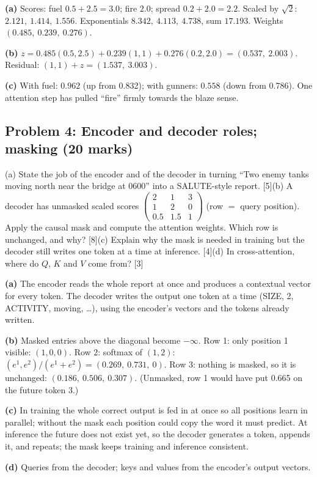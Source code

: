 \documentclass[11pt]{article}
\begin{document}
\begin{soln}\textbf{(a)} Scores: fuel $0.5+2.5=3.0$; fire $2.0$; spread $0.2+2.0=2.2$. Scaled by $\sqrt2$: $2.121,\ 1.414,\ 1.556$. Exponentials $8.342,\ 4.113,\ 4.738$, sum $17.193$. Weights $(\mathbf{0.485},\ \mathbf{0.239},\ \mathbf{0.276})$.

\textbf{(b)} $z=0.485(0.5,2.5)+0.239(1,1)+0.276(0.2,2.0)=(\mathbf{0.537},\ \mathbf{2.003})$. Residual: $(1,1)+z=(\mathbf{1.537},\ \mathbf{3.003})$.

\textbf{(c)} With fuel: $\mathbf{0.962}$ (up from 0.832); with gunners: $\mathbf{0.558}$ (down from 0.786). One attention step has pulled ``fire'' firmly towards the blaze sense.\end{soln}

\subsection{Problem 4: Encoder and decoder roles; masking \normalfont\small\color{GreyN}(20 marks)}

\begin{prob}(a) State the job of the encoder and of the decoder in turning ``Two enemy tanks moving north near the bridge at 0600'' into a SALUTE-style report. [5]\newline (b) A decoder has unmasked scaled scores $\begin{pmatrix}2&1&3\\1&2&0\\0.5&1.5&1\end{pmatrix}$ (row $=$ query position). Apply the causal mask and compute the attention weights. Which row is unchanged, and why? [8]\newline (c) Explain why the mask is needed in training but the decoder still writes one token at a time at inference. [4]\newline (d) In cross-attention, where do $Q$, $K$ and $V$ come from? [3]\end{prob}

\begin{soln}\textbf{(a)} The encoder reads the whole report at once and produces a contextual vector for every token. The decoder writes the output one token at a time (SIZE, 2, ACTIVITY, moving, \ldots{}), using the encoder's vectors and the tokens already written.

\textbf{(b)} Masked entries above the diagonal become $-\infty$. Row 1: only position 1 visible: $(1,0,0)$. Row 2: softmax of $(1,2)$: $(e^1,e^2)/(e^1+e^2)=(\mathbf{0.269},\ \mathbf{0.731},\ 0)$. Row 3: nothing is masked, so it is unchanged: $(\mathbf{0.186},\ \mathbf{0.506},\ \mathbf{0.307})$. (Unmasked, row 1 would have put 0.665 on the future token 3.)

\textbf{(c)} In training the whole correct output is fed in at once so all positions learn in parallel; without the mask each position could copy the word it must predict. At inference the future does not exist yet, so the decoder generates a token, appends it, and repeats; the mask keeps training and inference consistent.

\textbf{(d)} Queries from the decoder; keys and values from the encoder's output vectors.\end{soln}
\end{document}
